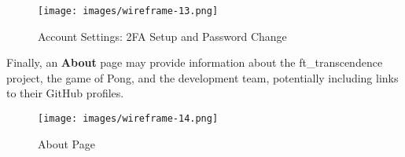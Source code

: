 \begin{figure}[H]
    \texttt{[image: images/wireframe-13.png]}
    \caption{Account Settings: 2FA Setup and Password Change}
    \label{fig:settings}
\end{figure}

Finally, an \textbf{About} page may provide information about the ft\_transcendence project, the game of Pong, and the development team, potentially including links to their GitHub profiles.

\begin{figure}[H]
    \texttt{[image: images/wireframe-14.png]}
    \caption{About Page}
    \label{fig:about-page}
\end{figure}
